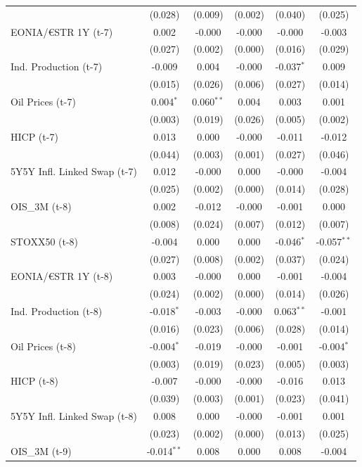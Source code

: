 \begin{longtable}[t]{lccccc}
 & (0.028) & (0.009) & (0.002) & (0.040) & (0.025)\\
EONIA/€STR 1Y (t-7) & 0.002 & -0.000 & -0.000 & -0.000 & -0.003\\
 & (0.027) & (0.002) & (0.000) & (0.016) & (0.029)\\
Ind. Production (t-7) & -0.009 & 0.004 & -0.000 & -0.037$^{*}$ & 0.009\\
 & (0.015) & (0.026) & (0.006) & (0.027) & (0.014)\\
Oil Prices (t-7) & 0.004$^{*}$ & 0.060$^{**}$ & 0.004 & 0.003 & 0.001\\
 & (0.003) & (0.019) & (0.026) & (0.005) & (0.002)\\
HICP (t-7) & 0.013 & 0.000 & -0.000 & -0.011 & -0.012\\
 & (0.044) & (0.003) & (0.001) & (0.027) & (0.046)\\
5Y5Y Infl. Linked Swap (t-7) & 0.012 & -0.000 & 0.000 & -0.000 & -0.004\\
 & (0.025) & (0.002) & (0.000) & (0.014) & (0.028)\\
OIS\_3M (t-8) & 0.002 & -0.012 & -0.000 & -0.001 & 0.000\\
 & (0.008) & (0.024) & (0.007) & (0.012) & (0.007)\\
STOXX50 (t-8) & -0.004 & 0.000 & 0.000 & -0.046$^{*}$ & -0.057$^{**}$\\
 & (0.027) & (0.008) & (0.002) & (0.037) & (0.024)\\
EONIA/€STR 1Y (t-8) & 0.003 & -0.000 & 0.000 & -0.001 & -0.004\\
 & (0.024) & (0.002) & (0.000) & (0.014) & (0.026)\\
Ind. Production (t-8) & -0.018$^{*}$ & -0.003 & -0.000 & 0.063$^{**}$ & -0.001\\
 & (0.016) & (0.023) & (0.006) & (0.028) & (0.014)\\
Oil Prices (t-8) & -0.004$^{*}$ & -0.019 & -0.000 & -0.001 & -0.004$^{*}$\\
 & (0.003) & (0.019) & (0.023) & (0.005) & (0.003)\\
HICP (t-8) & -0.007 & -0.000 & -0.000 & -0.016 & 0.013\\
 & (0.039) & (0.003) & (0.001) & (0.023) & (0.041)\\
5Y5Y Infl. Linked Swap (t-8) & 0.008 & 0.000 & -0.000 & -0.001 & 0.001\\
 & (0.023) & (0.002) & (0.000) & (0.013) & (0.025)\\
OIS\_3M (t-9) & -0.014$^{**}$ & 0.008 & 0.000 & 0.008 & -0.004\\

\end{longtable}

